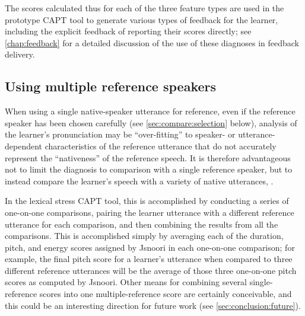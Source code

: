	



	\vspace{2em}
	
	The scores calculated thus for each of the three feature types are used in the prototype CAPT tool to generate various types of feedback for the learner, including the explicit feedback of reporting their scores directly; see \cref{chap:feedback} for a detailed discussion of the use of these diagnoses in feedback delivery.


	\subsection{Using multiple reference speakers}
	\label{sec:compare:multi}
	
	When using a single native-speaker utterance for reference, even if the reference speaker has been chosen carefully (see \cref{sec:compare:selection} below), analysis of the learner's pronunciation may be ``over-fitting'' to speaker- or utterance-dependent characteristics of the reference utterance that do not accurately represent the ``nativeness'' of the reference speech. It is therefore advantageous not to limit the diagnosis to comparison with a single reference speaker, but to instead compare the learner's speech with a variety of native utterances, .
	
	In the lexical stress CAPT tool, this is accomplished by conducting a series of one-on-one comparisons, pairing the learner utterance with a different reference utterance for each comparison, and then combining the results from all the comparisons. This is accomplished simply by averaging each of the duration, pitch, and energy scores assigned by Jsnoori in each one-on-one comparison; for example, the final pitch score for a learner's utterance when compared to three different reference utterances will be the average of those three one-on-one pitch scores as computed by Jsnoori. Other means for combining several single-reference scores into one multiple-reference score are certainly conceivable, and this could be an interesting direction for future work (see \cref{sec:conclusion:future}).
	
